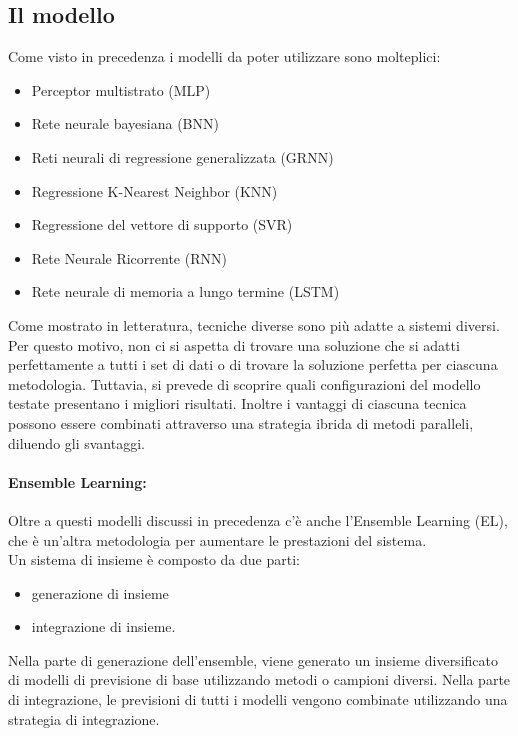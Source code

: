 \documentclass[12pt,a4paper]{report}
\begin{document}
\subsection{Il modello}
Come visto in precedenza i modelli da poter utilizzare sono molteplici:
\begin{itemize}
    \item Perceptor multistrato (MLP)
    \item Rete neurale bayesiana (BNN)
    \item Reti neurali di regressione generalizzata (GRNN)
    \item Regressione K-Nearest Neighbor (KNN)
    \item Regressione del vettore di supporto (SVR)
    \item Rete Neurale Ricorrente (RNN)
    \item Rete neurale di memoria a lungo termine (LSTM)
\end{itemize}

Come mostrato in letteratura, tecniche diverse sono più adatte a sistemi diversi. Per questo motivo, non ci si aspetta di trovare una soluzione che si adatti perfettamente a tutti i set di dati o di trovare la soluzione perfetta per ciascuna metodologia. Tuttavia, si prevede di scoprire quali configurazioni del modello testate presentano i migliori risultati.
Inoltre i vantaggi di ciascuna tecnica possono essere combinati attraverso una strategia ibrida di metodi paralleli, diluendo gli svantaggi.

\paragraph*{Ensemble Learning:}
Oltre a questi modelli discussi in precedenza c'è anche l'Ensemble Learning (EL), che è un'altra metodologia per aumentare le prestazioni del sistema.\\
Un sistema di insieme è composto da due parti:
\begin{itemize}
    \item generazione di insieme
    \item integrazione di insieme.
\end{itemize}
Nella parte di generazione dell'ensemble, viene generato un insieme diversificato di modelli di previsione di base utilizzando metodi o campioni diversi. Nella parte di integrazione, le previsioni di tutti i modelli vengono combinate utilizzando una strategia di integrazione.\\
\end{document}
